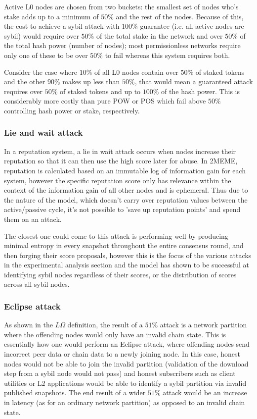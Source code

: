 \documentclass{article}
\theoremstyle{definition}
\theoremstyle{remark}
\theoremstyle{plain}
\begin{document}
Active L0 nodes are chosen from two buckets: the smallest set of nodes who's stake adds up to a minimum of $50\%$ and the rest of the nodes. Because of this, the cost to achieve a sybil attack with $100\%$ guarantee (i.e. all active nodes are sybil) would require over $50\%$ of the total stake in the network and over $50\%$ of the total hash power (number of nodes); most permissionless networks require only one of these to be over $50\%$ to fail whereas this system requires both.

Consider the case where $10\%$ of all L0 nodes contain over $50\%$ of staked tokens and the other $90\%$ makes up less than $50\%$, that would mean a guaranteed attack requires over $50\%$ of staked tokens and up to $100\%$ of the hash power. This is considerably more costly than pure POW or POS which fail above $50\%$ controlling hash power or stake, respectively.

\subsubsection{Lie and wait attack}
In a reputation system, a lie in wait attack occurs when nodes increase their reputation so that it can then use the high score later for abuse. In 2MEME, reputation is calculated based on an immutable log of information gain for each system, however the specific reputation score only has relevance within the context of the information gain of all other nodes and is ephemeral. Thus due to the nature of the model, which doesn't carry over reputation values between the active/passive cycle, it's not possible to 'save up reputation points' and spend them on an attack.

The closest one could come to this attack is performing well by producing minimal entropy in every snapshot throughout the entire consensus round, and then forging their score proposals, however this is the focus of the various attacks in the experimental analysis section and the model has shown to be successful at identifying sybil nodes regardless of their scores, or the distribution of scores across all sybil nodes.

\subsubsection{Eclipse attack}
As shown in the $L\Omega$ definition, the result of a $51\%$ attack is a network partition where the offending nodes would only have an invalid chain state. This is essentially how one would perform an Eclipse attack, where offending nodes send incorrect peer data or chain data to a newly joining node. In this case, honest nodes would not be able to join the invalid partition (validation of the download step from a sybil node would not pass) and honest subscribers such as client utilities or L2 applications would be able to identify a sybil partition via invalid published snapshots. The end result of a wider $51\%$ attack would be an increase in latency (as for an ordinary network partition) as opposed to an invalid chain state.
\end{document}
